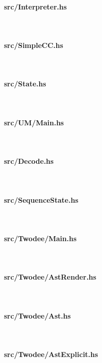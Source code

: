 \documentclass[a4paper, oneside, 10pt, draft]{memoir}
\begin{document}
\paragraph{src/Interpreter.hs}\ \\

\clearpage\paragraph{src/SimpleCC.hs}\ \\

\clearpage\paragraph{src/State.hs}\ \\

\clearpage\paragraph{src/UM/Main.hs}\ \\

\clearpage\paragraph{src/Decode.hs}\ \\

\clearpage\paragraph{src/SequenceState.hs}\ \\

\clearpage\paragraph{src/Twodee/Main.hs}\ \\

\clearpage\paragraph{src/Twodee/AstRender.hs}\ \\

\clearpage\paragraph{src/Twodee/Ast.hs}\ \\

\clearpage\paragraph{src/Twodee/AstExplicit.hs}\ \\
\end{document}
